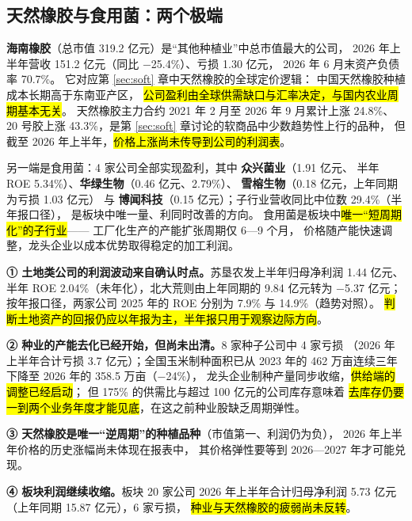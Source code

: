 \subsection{天然橡胶与食用菌：两个极端}
\label{sec:planting-extremes}

\textbf{海南橡胶}（总市值 \num{319.2} 亿元）是“其他种植业”中总市值最大的公司，
2026 年上半年营收 \num{151.2} 亿元（同比 \num{-25.4}\%）、亏损 \num{1.30} 亿元，
2026 年 6 月末资产负债率 \num{70.7}\%。
它对应第 \ref{sec:soft} 章中天然橡胶的全球定价逻辑：
中国天然橡胶种植成本长期高于东南亚产区，
\hl{公司盈利由全球供需缺口与汇率决定，与国内农业周期基本无关}。
天然橡胶主力合约 2021 年 2 月至 2026 年 9 月累计上涨 \num{24.8}\%、
20 号胶上涨 \num{43.3}\%，是第 \ref{sec:soft} 章讨论的软商品中少数趋势性上行的品种，
但截至 2026 年上半年，\hl{价格上涨尚未传导到公司的利润表}。

另一端是食用菌：\num{4} 家公司全部实现盈利，其中 \textbf{众兴菌业}（\num{1.91} 亿元、
半年 ROE \num{5.34}\%）、\textbf{华绿生物}（\num{0.46} 亿元、\num{2.79}\%）、
\textbf{雪榕生物}（\num{0.18} 亿元，上年同期为亏损 \num{1.03} 亿元）
与 \textbf{博闻科技}（\num{0.15} 亿元）；子行业营收同比中位数 \num{+29.4}\%（半年报口径），
是板块中唯一量、利同时改善的方向。
食用菌是板块中\hl{唯一“短周期化”的子行业}——
工厂化生产的产能扩张周期仅 \num{6}---\num{9} 个月，
价格随产能快速调整，龙头企业以成本优势取得稳定的加工利润。

\begin{keybox}[种植业的画像结论]
\normalsize
\textbf{① 土地类公司的利润波动来自确认时点。}苏垦农发上半年归母净利润 \num{1.44} 亿元、
半年 ROE \num{2.04}\%（未年化），北大荒则由上年同期的 \num{+9.84} 亿元转为 \num{-5.37} 亿元；
按年报口径，两家公司 2025 年的 ROE 分别为 \num{7.9}\% 与 \num{14.9}\%（趋势对照）。
\hl{判断土地资产的回报仍应以年报为主，半年报只用于观察边际方向}。\par\vspace{3pt}
\textbf{② 种业的产能去化已经开始，但尚未出清。}\num{8} 家种子公司中 \num{4} 家亏损
（2026 年上半年合计亏损 \num{3.7} 亿元）；全国玉米制种面积已从 2023 年的
\num{462} 万亩连续三年下降至 2026 年的 \num{358.5} 万亩（\num{-24}\%），
龙头企业制种产量同步收缩，\hl{供给端的调整已经启动}；
但 \num{175}\% 的供需比与超过 \num{100} 亿元的公司库存意味着
\hl{去库存仍要一到两个业务年度才能见底}，在这之前种业股缺乏周期弹性。\par\vspace{3pt}
\textbf{③ 天然橡胶是唯一“逆周期”的种植品种}（市值第一、利润仍为负），
2026 年上半年价格的历史涨幅尚未体现在报表中，
其价格弹性要等到 2026---2027 年才可能兑现。\par\vspace{3pt}
\textbf{④ 板块利润继续收缩。}板块 \num{20} 家公司 2026 年上半年合计归母净利润
\num{5.73} 亿元（上年同期 \num{15.87} 亿元），\num{6} 家亏损，
\hl{种业与天然橡胶的疲弱尚未反转}。
\end{keybox}

